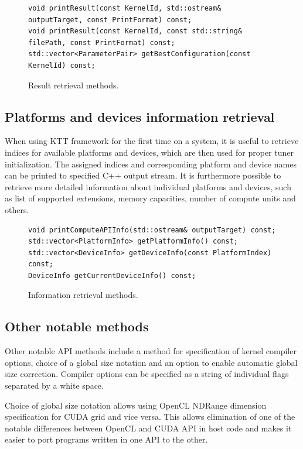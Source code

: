 \documentclass
[
    digital, %
    oneside, %
    table, %
    nolof, %
    nolot, %
    nocover %
]{fithesis3}
\begin{document}
\begin{figure}
\begin{lstlisting}
void printResult(const KernelId, std::ostream& outputTarget, const PrintFormat) const;
void printResult(const KernelId, const std::string& filePath, const PrintFormat) const;
std::vector<ParameterPair> getBestConfiguration(const KernelId) const;
\end{lstlisting}
\caption{Result retrieval methods.}
\label{ktt-result-methods}
\end{figure}

\subsection{Platforms and devices information retrieval}
When using KTT framework for the first time on a system, it is useful to retrieve indices for available platforms and devices, which are then used for
proper tuner initialization. The assigned indices and corresponding platform and device names can be printed to specified C++ output stream. It is
furthermore possible to retrieve more detailed information about individual platforms and devices, such as list of supported extensions, memory
capacities, number of compute units and others.

\begin{figure}
\begin{lstlisting}
void printComputeAPIInfo(std::ostream& outputTarget) const;
std::vector<PlatformInfo> getPlatformInfo() const;
std::vector<DeviceInfo> getDeviceInfo(const PlatformIndex) const;
DeviceInfo getCurrentDeviceInfo() const;
\end{lstlisting}
\caption{Information retrieval methods.}
\label{ktt-information-methods}
\end{figure}

\subsection{Other notable methods}
Other notable API methods include a method for specification of kernel compiler options, choice of a global size notation and an option to enable
automatic global size correction. Compiler options can be specified as a string of individual flags separated by a white space.

Choice of global size notation allows using OpenCL NDRange dimension specification for CUDA grid and vice versa. This allows elimination of one of the
notable differences between OpenCL and CUDA API in host code and makes it easier to port programs written in one API to the other.
\end{document}
